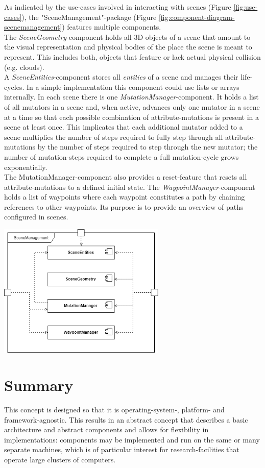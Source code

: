 As indicated by the use-cases involved in interacting with scenes (Figure \ref{fig:use-cases}), the "SceneManagement"-package (Figure \ref{fig:component-diagram-scenemanagement}) features multiple components.\\
The \textit{SceneGeometry}-component holds all 3D objects of a scene that amount to the visual representation and physical bodies of the place the scene is meant to represent. This includes both, objects that feature or lack actual physical collision (e.g. clouds).\\
A \textit{SceneEntities}-component stores all \textit{entities} of a scene and manages their life-cycles. In a simple implementation this component could use lists or arrays internally.
In each scene there is one \textit{MutationManager}-component. It holds a list of all mutators in a scene and, when active, advances only one mutator in a scene at a time so that each possible combination of attribute-mutations is present in a scene at least once. This implicates that each additional mutator added to a scene multiplies the number of steps required to fully step through all attribute-mutations by the number of steps required to step through the new mutator; the number of mutation-steps required to complete a full mutation-cycle grows exponentially.\\
The MutationManager-component also provides a reset-feature that resets all attribute-mutations to a defined initial state.
The \textit{WaypointManager}-component holds a list of waypoints where each waypoint constitutes a path by chaining references to other waypoints. Its purpose is to provide an overview of paths configured in scenes.\\
\begin{center}
\noindent\includegraphics[width=8cm]{tex/img/ch04/ComponentDiagram_SceneManagement04.png}
\label{fig:component-diagram-scenemanagement}
\end{center}

\section{Summary}
This concept is designed so that it is operating-system-, platform- and framework-agnostic. This results in an abstract concept that describes a basic architecture and abstract components and allows for flexibility in implementations: components may be implemented and run on the same or many separate machines, which is of particular interest for research-facilities that operate large clusters of computers.